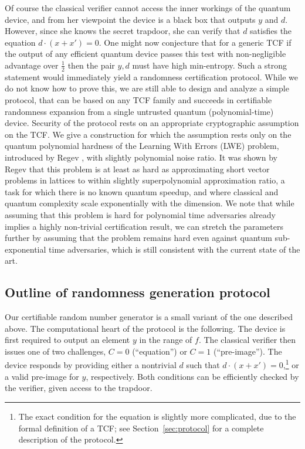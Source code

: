 \documentclass[11pt]{article}
\theoremstyle{remark}
\theoremstyle{definition}
\begin{document}
Of course the classical verifier cannot access the inner workings of the quantum device, and from her viewpoint the device is a black box that outputs $y$ and $d$. However, since she knows the secret trapdoor, she can verify that $d$ satisfies the equation  $d\cdot(x + x') = 0$. 
One might now conjecture that for a generic TCF if the output of any efficient quantum device passes this test with non-negligible advantage over $\frac{1}{2}$ then the pair $y,d$ must have high min-entropy. Such a strong statement would immediately yield a randomness certification protocol. 
While we do not know how to prove this, we are still able to design and analyze a simple protocol, that can be based on any TCF family and succeeds in certifiable randomness expansion from a single untrusted quantum (polynomial-time) device. Security of the protocol rests on an appropriate cryptographic assumption on the TCF. We give a construction for which the assumption rests only on the quantum polynomial hardness of the Learning With Errors (LWE) problem, introduced by Regev \cite{regev2005}, with slightly polynomial noise ratio. It was shown by Regev that this problem is at least as hard as approximating short vector problems in lattices to within slightly superpolynomial approximation ratio, a task for which there is no known quantum speedup, and where classical and quantum complexity scale exponentially with the dimension. We note that while assuming that this problem is hard for polynomial time adversaries already implies a highly non-trivial certification result, we can stretch the parameters further by assuming that the problem remains hard even against quantum sub-exponential time adversaries, which is still consistent with the current state of the art. 

\subsection{Outline of randomness generation protocol}

Our certifiable random number generator is a small variant of the one described above. 
The computational heart of the protocol is the following. The device is first required to output an element $y$ in the range of $f$. The classical verifier then issues one of 
two challenges,  $C=0$ (``equation'') or $C=1$ (``pre-image''). The device responds by providing either a nontrivial $d$ such that $d\cdot(x + x') = 0$,\footnote{The exact condition for the equation is slightly more complicated, due to the formal definition of a TCF; see Section~\ref{sec:protocol} for a complete description of the protocol.} or a valid pre-image for $y$, respectively. Both conditions can be efficiently checked by the verifier, given access to the trapdoor. 
\end{document}
